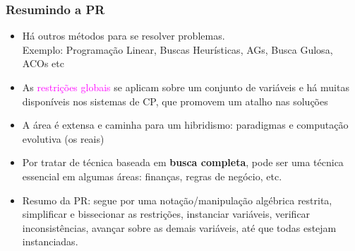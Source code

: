 \documentclass{beamer}
\begin{document}
\begin{frame}[fragile]
\frametitle{Resumindo a PR}

\begin{itemize}
  \item Há outros métodos para se resolver problemas.\\
  Exemplo: Programação Linear, Buscas Heurísticas, AGs, Busca Gulosa, ACOs  etc

  \pause  
  \item As \textcolor{magenta}{restrições globais} se aplicam sobre um conjunto de variáveis
  e há muitas disponíveis nos sistemas de CP, que promovem um atalho nas soluções

  \pause
  \item A área é extensa e caminha para um hibridismo: paradigmas e computação evolutiva (os reais)
  
  \pause
  \item Por tratar de técnica baseada em {\bf busca completa}, pode ser uma técnica essencial em algumas áreas: finanças, regras de negócio, etc. 

  \pause
  \item Resumo da PR: segue por uma notação/manipulação algébrica restrita,
        simplificar e bissecionar as restrições, instanciar variáveis, 
        verificar inconsistências,   avançar sobre as demais variáveis, até que todas 
        estejam instanciadas.
  

\end{itemize}
\end{frame}
\end{document}
